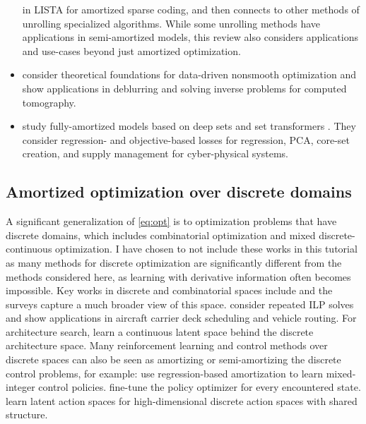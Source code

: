 \begin{itemize}
  in LISTA \citep{gregor2010learning} for amortized
  sparse coding, and then connects to other methods
  of unrolling specialized algorithms.
  While some unrolling methods have applications in
  semi-amortized models, this review also considers
  applications and use-cases beyond just
  amortized optimization.
\item \citet{banert2020data} consider theoretical foundations
  for data-driven nonsmooth optimization and show applications
  in deblurring and solving inverse problems for
  computed tomography.
\item \citet{liu2022teaching} study fully-amortized
  models based on deep sets \citep{zaheer2017deep}
  and set transformers \citep{lee2019set}.
  They consider regression- and objective-based losses
  for regression, PCA, core-set creation, and
  supply management for cyber-physical systems.
\end{itemize}

\subsection{Amortized optimization over discrete domains}
A significant generalization of \cref{eq:opt} is to optimization
problems that have discrete domains,
which includes combinatorial optimization
and mixed discrete-continuous optimization.
I have chosen to not include these works in this tutorial
as many methods for discrete optimization are significantly
different from the methods considered here, as learning with
derivative information often becomes impossible.
Key works in discrete and combinatorial spaces include
\citet{khalil2016learning,dai2017learning,jeong2019learning,bertsimas2019online,shao2021learning,bertsimas2021voice,cappart2021combinatorial}
and the surveys
\citep{lodi2017learning,bengio2021machine,kotary2021end}
capture a much broader view of this space.
\citet{banerjee2015efficiently} consider repeated ILP solves
and show applications in aircraft carrier deck scheduling and vehicle routing.
For architecture search, \citet{luo2018neural} learn a continuous
latent space behind the discrete architecture space.
Many reinforcement learning and control methods over discrete
spaces can also be seen as amortizing or semi-amortizing the
discrete control problems, for example:
\citet{cauligi2020learning,cauligi2021coco} use regression-based
amortization to learn mixed-integer control policies.
\citet{fickinger2021scalable} fine-tune the policy
optimizer for every encountered state.
\citet{tennenholtz2019natural,chandak2019learning,van2020q}
learn latent action spaces for high-dimensional
discrete action spaces with shared structure.

